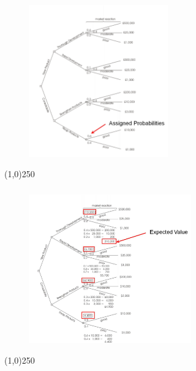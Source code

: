\begin{frame}
\frametitle{}
\begin{figure}
	\centering
		\includegraphics[width = 6cm]{images/evmtree1.jpg}
	\label{fig:tree2}
\end{figure}
\end{frame}\begin{center}\line(1,0){250}\end{center}






\begin{frame}
\frametitle{}
\begin{figure}
	\centering
		\includegraphics[width = 7cm]{images/evmtree.jpg}
	\label{fig:tree3}
\end{figure}
\end{frame}\begin{center}\line(1,0){250}\end{center}







